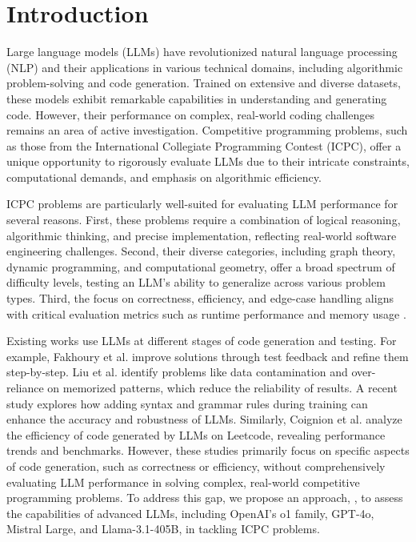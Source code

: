 \section{Introduction}
Large language models (LLMs)\cite{b14} have revolutionized natural language processing (NLP)\cite{b15} and their applications in various technical domains, including algorithmic problem-solving and code generation. Trained on extensive and diverse datasets, these models exhibit remarkable capabilities in understanding and generating code\cite{b19}. However, their performance on complex, real-world coding challenges remains an area of active investigation. Competitive programming problems, such as those from the International Collegiate Programming Contest (ICPC)\cite{b8}, offer a unique opportunity to rigorously evaluate LLMs due to their intricate constraints, computational demands, and emphasis on algorithmic efficiency.

ICPC problems are particularly well-suited for evaluating LLM performance\cite{Austin2021Program} for several reasons. First, these problems require a combination of logical reasoning, algorithmic thinking, and precise implementation, reflecting real-world software engineering challenges. Second, their diverse categories, including graph theory, dynamic programming, and computational geometry, offer a broad spectrum of difficulty levels, testing an LLM's\cite{Carlini2022Quantifying} ability to generalize across various problem types. Third, the focus on correctness, efficiency, and edge-case handling aligns with critical evaluation metrics such as runtime performance and memory usage \cite{b1,b2,b10}.

Existing works use LLMs at different stages of code generation and testing. For example, Fakhoury et al. \cite{b3} improve solutions through test feedback and refine them step-by-step. Liu et al. \cite{b1} identify problems like data contamination and over-reliance on memorized patterns, which reduce the reliability of results. A recent study \cite{b13} explores how adding syntax and grammar rules during training can enhance the accuracy and robustness of LLMs. Similarly, Coignion et al. \cite{b27} analyze the efficiency of code generated by LLMs on Leetcode, revealing performance trends and benchmarks. However, these studies primarily focus on specific aspects of code generation, such as correctness or efficiency, without comprehensively evaluating LLM performance in solving complex, real-world competitive programming problems. To address this gap, we propose an approach, \Name{}, to assess the capabilities of advanced LLMs, including OpenAI’s o1 family\cite{b18}, GPT-4o\cite{b16}, Mistral Large\cite{b7}, and Llama-3.1-405B\cite{b17}, in tackling ICPC problems. 

